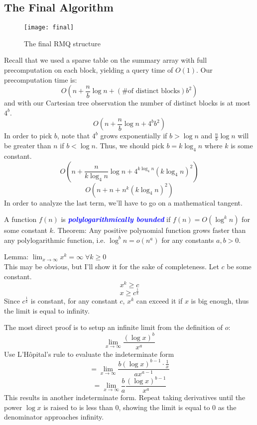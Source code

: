 \documentclass[11pt, oneside]{article}
\newcommand{\emphasis}[1]{\textcolor{blue}{\textbf{\textit{#1}}}}
\begin{document}
\subsection{The Final Algorithm}

\begin{figure}[h]
\centering
\texttt{[image: final]}
\caption{The final RMQ structure}
\end{figure}

Recall that we used a sparse table on the summary array with full precomputation on each block,
yielding a query time of \( O(1) \). Our precomputation time is:
\[ O(n + \frac{n}{b} \log n + (\text{\# of distinct blocks}) b^2) \]
and with our Cartesian tree observation the number of distinct blocks is at most \( 4^b \).
\[ O(n + \frac{n}{b} \log n + 4^b b^2) \]
In order to pick \( b \), note that \( 4^b \) grows exponentially if \( b > \log n \) and \( \frac{n}{b} \log n \)
will be greater than \( n \) if \( b < \log n \). Thus, we should pick \( b = k \log_4 n \) where \( k \) is some constant.
\[ O(n + \frac{n}{k \log_4 n} \log n + 4^{k \log_4 n} (k \log_4 n)^2) \]
\[ O(n + n + n^k (k \log_4 n)^2) \]
In order to analyze the last term, we'll have to go on a mathematical tangent.

A function \( f(n) \) is \emphasis{polylogarithmically bounded} if \( f(n) = O( \log^k n) \)
for some constant \( k \).
Theorem: Any positive polynomial function grows faster than any polylogarithmic function,
i.e. \( \log^b n = o(n^a) \) for any constants \( a, b > 0 \).

Lemma: \( \lim_{x \to \infty} x^k = \infty \; \forall k \geq 0 \) \\
This may be obvious, but I'll show it for the sake of completeness.
Let \( c \) be some constant.
\[ x^k \geq c \]
\[ x \geq c^{\frac{1}{k}} \]
Since \( c^{\frac{1}{k}} \) is constant, for any constant \( c \), \( x^k \) can
exceed it if \( x \) is big enough, thus the limit is equal to infinity.

The most direct proof is to setup an infinite limit from the definition of \( o \):
\[ \lim_{x \to \infty} \frac{(\log x)^{b}}{x^a} \]
Use L'Hôpital's rule to evaluate the indeterminate form
\[ = \lim_{x \to \infty} \frac{b (\log x)^{b - 1} \cdot \frac{1}{x}}{a x^{a - 1}} \]
\[ = \lim_{x \to \infty} \frac{b}{a} \frac{(\log x)^{b - 1}}{x^a} \]
This results in another indeterminate form. Repeat taking derivatives until the power \( \log x \) is raised to
is less than 0, showing the limit is equal to 0 as the denominator approaches infinity.
\end{document}
